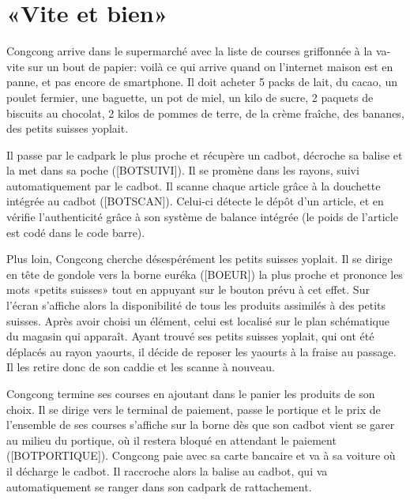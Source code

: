 \section{«Vite et bien»}

Congcong arrive dans le supermarché avec la liste de courses griffonnée à la va-vite sur un bout de papier: voilà ce qui arrive quand on l'internet maison est en panne, et pas encore de smartphone.
Il doit acheter 5 packs de lait, du cacao, un poulet fermier, une baguette, un pot de miel, un kilo de sucre, 2 paquets de biscuits au chocolat, 2 kilos de pommes de terre, de la crème fraîche, des bananes, des petits suisses yoplait.
\par
Il passe par le cadpark le plus proche et récupère un cadbot, décroche sa balise et la met dans sa poche ([BOTSUIVI]).
Il se promène dans les rayons, suivi automatiquement par le cadbot.
Il scanne chaque article grâce à la douchette intégrée au cadbot ([BOTSCAN]).
Celui-ci détecte le dépôt d'un article, et en vérifie l'authenticité grâce à son système de balance intégrée (le poids de l'article est codé dans le code barre).
\par
Plus loin, Congcong cherche désespérément les petits suisses yoplait.
Il se dirige en tête de gondole vers la borne euréka ([BOEUR]) la plus proche et prononce les mots «petits suisses» tout en appuyant sur le bouton prévu à cet effet.
Sur l'écran s'affiche alors la disponibilité de tous les produits assimilés à des petits suisses.
Après avoir choisi un élément, celui est localisé sur le plan schématique du magasin qui apparaît.
Ayant trouvé ses petits suisses yoplait, qui ont été déplacés au rayon yaourts, il décide de reposer les yaourts à la fraise au passage.
Il les retire donc de son caddie et les scanne à nouveau.
\par
Congcong termine ses courses en ajoutant dans le panier les produits de son choix.
Il se dirige vers le terminal de paiement, passe le portique et le prix de l'ensemble de ses courses s'affiche sur la borne dès que son cadbot vient se garer au milieu du portique, où il restera bloqué en attendant le paiement ([BOTPORTIQUE]).
Congcong paie avec sa carte bancaire et va à sa voiture où il décharge le cadbot.
Il raccroche alors la balise au cadbot, qui va automatiquement se ranger dans son cadpark de rattachement.
